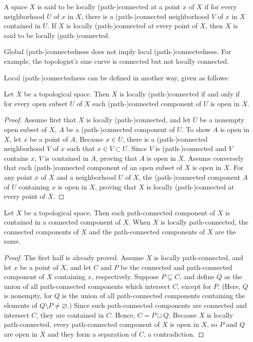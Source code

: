 \begin{defi}
    A space $X$ is said to be locally (path-)connected at a point $x$ of $X$ if for every neighborhood $U$ of $x$ in $X$, there is a (path-)connected neighborhood $V$ of $x$ in $X$ contained in $U$.
    If $X$ is locally (path-)connected at every point of $X$, then $X$ is said to be locally (path-)connected.
\end{defi}
\begin{rmk}
    Global (path-)connectedness does not imply local (path-)connectedness.
    For example, the topologist's sine curve is connected but not locally connected.
\end{rmk}

Local (path-)connectedness can be defined in another way, given as follows:
\begin{prop}
    Let $X$ be a topological space.
    Then $X$ is locally (path-)connected if and only if for every open subset $U$ of $X$ each (path-)connected component of $U$ is open in $X$.
\end{prop}
\begin{proof}
    Assume first that $X$ is locally (path-)connected, and let $U$ be a nonempty open subset of $X$, $A$ be a (path-)connected component of $U$.
    To show $A$ is open in $X$, let $x$ be a point of $A$.
    Because $x\in U$, there is a (path-)connected neighborhood $V$ of $x$ such that $x\in V\subset U$.
    Since $V$ is (path-)connected and $V$ contains $x$, $V$ is contained in $A$, proving that $A$ is open in $X$.
    Assume conversely that each (path-)connected component of an open subset of $X$ is open in $X$.
    For any point $x$ of $X$ and a neighborhood $U$ of $X$, the (path-)connected component $A$ of $U$ containing $x$ is open in $X$, proving that $X$ is locally (path-)connected at every point of $X$.
\end{proof}

\begin{thm}
    Let $X$ be a topological space.
    Then each path-connected component of $X$ is contained in a connected component of $X$.
    When $X$ is locally path-connected, the connected components of $X$ and the path-connected components of $X$ are the same.
\end{thm}
\begin{proof}
    The first half is already proved.
    Assume $X$ is locally path-connected, and let $x$ be a point of $X$, and let $C$ and $P$ be the connected and path-connected component of $X$ containing $x$, respectively.
    Suppose $P\subsetneq C$, and define $Q$ as the union of all path-connected components which intersect $C$, except for $P$. (Here, $Q$ is nonempty, for $Q$ is the union of all path-connected components containing the elements of $Q\setminus P\neq\varnothing$.)
    Since such path-connected components are connected and intersect $C$, they are contained in $C$.
    Hence, $C=P\sqcup Q$.
    Because $X$ is locally path-connected, every path-connected component of $X$ is open in $X$, so $P$ and $Q$ are open in $X$ and they form a separation of $C$, a contradiction.
\end{proof}

